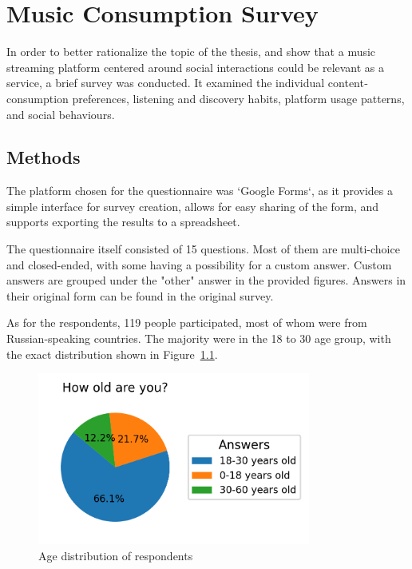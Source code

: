 \chapter{Music Consumption Survey}\label{chap:survey}

In order to better rationalize the topic of the thesis, and show that a music streaming platform centered around social
interactions could be relevant as a service, a brief survey was conducted. It examined the
individual content‐consumption preferences, listening and discovery habits, platform usage patterns, and
social behaviours.


\section{Methods}
The platform chosen for the questionnaire was `Google Forms`\cite{googleforms}, as it provides a simple interface for
survey creation, allows for easy sharing of the form, and supports exporting the results to a spreadsheet.

The questionnaire itself consisted of 15 questions.
Most of them are multi-choice and closed-ended, with some having a possibility for a custom answer.
Custom answers are grouped under the "other" answer in the provided figures. Answers in their original form
can be found in the original survey.

As for the respondents, 119 people participated, most of whom were from Russian-speaking countries.
The majority were in the 18 to 30 age group, with the exact distribution shown in Figure~\ref{fig:age}.

\begin{figure}[htbp]
    \centering
    \includegraphics[width=0.8\textwidth, keepaspectratio]{charts/age.png}
    \caption{Age distribution of respondents}
    \label{fig:age}
\end{figure}


